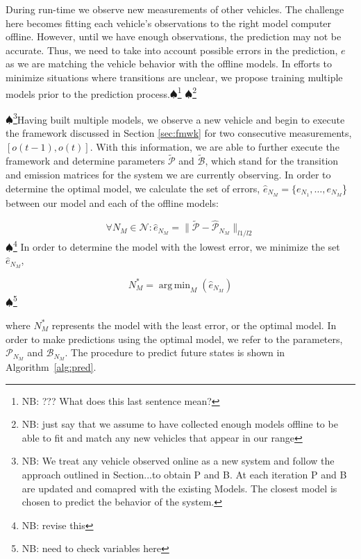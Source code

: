 \documentclass[letterpaper, 10 pt, conference]{ieeeconf}  %
\DeclareMathOperator*{\argmin}{arg\,min}
\newcommand\NB[1]{$\spadesuit$\footnote{NB: #1}}
\begin{document}
During run-time we observe new measurements of other vehicles. The challenge here becomes fitting each vehicle's observations to the right model computer offline. However, until we have enough observations, the prediction may not be accurate. Thus, we need to take into account possible errors in the prediction, $e$ as we are matching the vehicle behavior with the offline models. In efforts to minimize situations where transitions are unclear, we propose training multiple models prior to the prediction process.\NB{??? What does this last sentence mean?} \NB{just say that we assume to have collected enough models offline to be able to fit and match any new vehicles that appear in our range}

\NB{We treat any vehicle observed online as a new system and follow the approach outlined in Section...to obtain P and B. At each iteration P and B are updated and comapred with the existing Models. The closest model is chosen to predict the behavior of the system. }Having built multiple models, we observe a new vehicle and begin to execute the framework discussed in Section \ref{sec:fmwk} for two consecutive measurements, $\left[o(t-1),o(t)\right]$. With this information, we are able to further execute the framework and determine parameters $\tilde{\mathcal{P}}$ and $\tilde{\mathcal{B}}$, which stand for the transition and emission matrices for the system we are currently observing. In order to determine the optimal model, we calculate the set of errors, $\hat{e}_{N_{M}} = \{e_{N_1},\ldots,e_{N_M}$\} between our model and each of the offline models:

\begin{equation}
    \forall{N_M} \in \mathcal{N}: \hat{e}_{N_M} = \lVert\tilde{\mathcal{P}}-\hat{\mathcal{P}}_{N_M}\rVert_{l1/l2}
\end{equation}
\NB{revise this}
In order to determine the model with the lowest error, we minimize the set $\hat{e}_{N_M}$,

\begin{equation}
    N_M^* = \argmin_{M}(\hat{e}_{N_M})
\end{equation}
\NB{need to check variables here}

where $N_M^*$ represents the model with the least error, or the optimal model. In order to make predictions using the optimal model, we refer to the parameters, $\mathcal{P}_{N_M}$ and $\mathcal{B}_{N_M}$. The procedure to predict future states is shown in Algorithm~\ref{alg:pred}.
\end{document}
